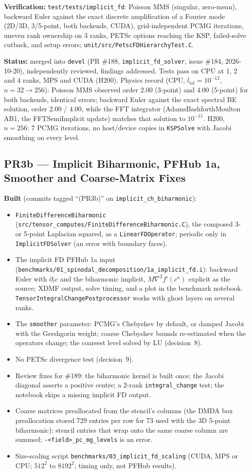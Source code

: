 \documentclass[11pt]{article}
\newcommand{\pr}[2]{\subsection{PR#1 --- #2}}
\newcommand{\status}[1]{\textcolor{marlinteal}{\textbf{Status:}} #1}
\begin{document}
\textbf{Verification:} \texttt{test/tests/implicit\_fd}: Poisson MMS
(singular, zero-mean), backward Euler against the exact discrete
amplification of a Fourier mode (2D/3D, 3/5-point, both backends, CUDA),
grid-independent PCMG iterations, uneven rank ownership on 3 ranks, PETSc
options reaching the KSP, failed-solve cutback, and setup errors;
\texttt{unit/src/PetscFDHierarchyTest.C}.

\status{merged into \texttt{devel} (PR \#188, \texttt{implicit\_fd\_solver}, issue \#184,
2026-10-20), independently reviewed, findings addressed. Tests pass on CPU at 1, 2 and 4 ranks,
MPS and CUDA (H200). Physics record (CPU, $l_{tol}=10^{-12}$, $n=32\to256$): Poisson MMS
observed order 2.00 (3-point) and 4.00 (5-point) for both backends, identical errors;
backward Euler against the exact spectral BE solution, order 2.00 / 4.00, while the FFT
integrator (AdamsBashforthMoulton AB1, the FFTSemiImplicit update) matches that solution to
$10^{-15}$. H200, $n=256$: 7 PCMG iterations, no host/device copies in \texttt{KSPSolve}
with Jacobi smoothing on every level.}

\pr{3b}{Implicit Biharmonic, PFHub 1a, Smoother and Coarse-Matrix Fixes}
\textbf{Built} (commits tagged ``(PR3b)'' on \texttt{implicit\_ch\_biharmonic}):
\begin{itemize}[leftmargin=*]
\item \texttt{FiniteDifferenceBiharmonic}
(\texttt{src/tensor\_computes/FiniteDifferenceBiharmonic.C}), the composed
3- or 5-point Laplacian squared, as a \texttt{LinearFDOperator}; periodic
only in \texttt{ImplicitFDSolver} (an error with boundary faces).
\item The implicit FD PFHub 1a input
(\texttt{benchmarks/01\_spinodal\_decomposition/1a\_implicit\_fd.i}):
backward Euler with $\partial_t c$ and the biharmonic implicit,
$M\nabla^2 f'(c^n)$ explicit as the source; XDMF output, solve timing, and a
plot in the benchmark notebook. \texttt{TensorIntegralChangePostprocessor}
works with ghost layers on several ranks.
\item The \texttt{smoother} parameter: PCMG's Chebyshev by default, or damped
Jacobi with the Gershgorin weight; coarse Chebyshev bounds re-estimated when the
operators change; the coarsest level solved by LU (decision~8).
\item No PETSc divergence test (decision~9).
\item Review fixes for \#189: the biharmonic kernel is built once; the Jacobi
diagonal asserts a positive centre; a 2-rank
\texttt{integral\_change} test; the notebook skips a missing implicit FD output.
\item Coarse matrices preallocated from the stencil's columns (the DMDA box
preallocation stored 729 entries per row for 73 used with the 3D 5-point
biharmonic); stencil entries that wrap onto the same coarse column are
summed; \texttt{-<field>\_pc\_mg\_levels} is an error.
\item Size-scaling script \texttt{benchmarks/03\_implicit\_fd\_scaling}
(CUDA, MPS or CPU; $512^2$ to $8192^2$; timing only, not PFHub results).
\end{itemize}
\end{document}

